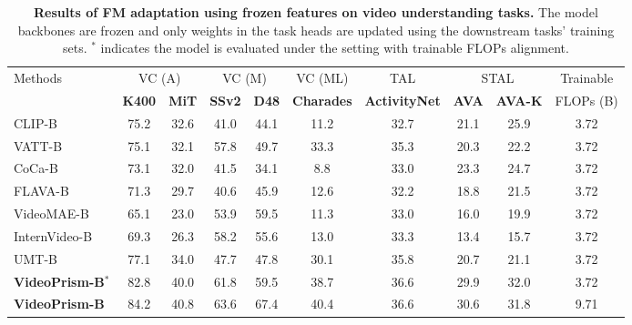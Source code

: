 \documentclass{article}
\theoremstyle{plain}
\theoremstyle{definition}
\theoremstyle{remark}
\newcommand{\OURS}{VideoPrism\xspace}
\begin{document}
\begin{table}
\begin{center}
\begin{scriptsize}
\begin{tabular}{l|l|c|c|l}
    \bottomrule
    \end{tabular}
\end{scriptsize}
    \end{center}
    \vskip -0.1in
\end{table} \begin{table}
\caption{
\textbf{Results of FM adaptation using frozen features on video understanding tasks.}
The model backbones are frozen and only weights in the task heads are updated using the downstream tasks' training sets.
$^{\ast}$ indicates the model is evaluated under the setting with trainable FLOPs alignment.
}
\label{tbl:videoglue_fz}
\begin{center}
\begin{scriptsize}
\begin{tabular}{@{}l|cc|cc|c|c|cc|c@{}} 
\toprule
\multirow{2}{*}{Methods} & \multicolumn{2}{c|}{VC (A)} & \multicolumn{2}{c|}{VC (M)} & VC (ML) & TAL & \multicolumn{2}{c|}{STAL} & Trainable \\
& \textbf{K400} & \textbf{MiT} & \textbf{SSv2} & \textbf{D48} & \textbf{Charades} & \textbf{ActivityNet} & \textbf{AVA} & \textbf{AVA-K} & FLOPs (B) \\
\midrule
CLIP-B~\cite{radford2021learning} & 75.2 & 32.6 & 41.0 & 44.1 & 11.2 & 32.7 & 21.1 & 25.9 & 3.72 \\
VATT-B~\cite{akbari2021vatt} & 75.1 & 32.1 & 57.8 & 49.7 & 33.3 & 35.3 & 20.3 & 22.2 & 3.72 \\
CoCa-B~\cite{yu2022coca} & 73.1 & 32.0 & 41.5 & 34.1 & 8.8 & 33.0 & 23.3 & 24.7 & 3.72 \\
FLAVA-B~\cite{singh2022flava} & 71.3 & 29.7 & 40.6 & 45.9 & 12.6 & 32.2 & 18.8 & 21.5 & 3.72 \\
VideoMAE-B~\cite{tong2022videomae} & 65.1 & 23.0 & 53.9 & 59.5 & 11.3 & 33.0 & 16.0 & 19.9 & 3.72 \\
InternVideo-B~\cite{wang2022internvideo} & 69.3 & 26.3 & 58.2 & 55.6 & 13.0 & 33.3 & 13.4 & 15.7 & 3.72 \\
UMT-B~\cite{li2023unmasked} & 77.1 & 34.0 & 47.7 & 47.8 & 30.1 & 35.8 & 20.7 & 21.1 & 3.72 \\
\textbf{\OURS-B}$^{\ast}$ & 82.8 & 40.0 & 61.8 & 59.5 & 38.7 & 36.6 & 29.9 & 32.0 & 3.72 \\
\textbf{\OURS-B} & 84.2 & 40.8 & 63.6 & 67.4 & 40.4 & 36.6 & 30.6 & 31.8 & 9.71 \\
\bottomrule
\end{tabular}
\end{scriptsize}
\end{center}

\end{table}
\end{document}
